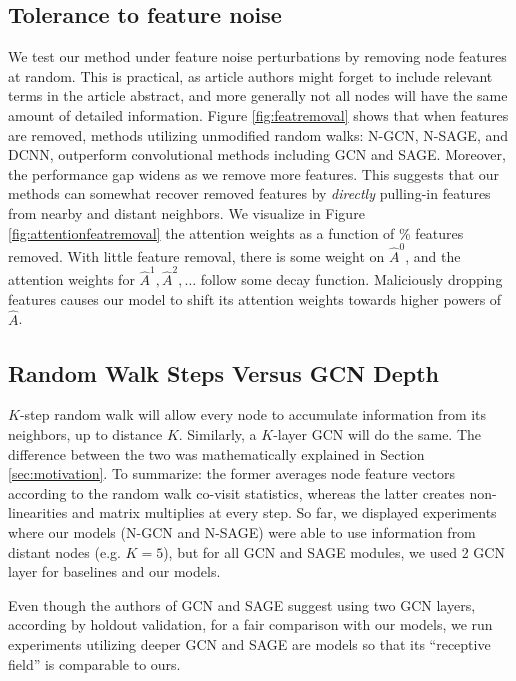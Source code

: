 \subsection{Tolerance to feature noise}
We test our method under feature noise perturbations by removing node features at random. This is practical, as article authors might forget to include relevant terms in the article abstract,
and more generally not all nodes will have the same amount of detailed information.
Figure \ref{fig:featremoval} shows that when features are removed, methods utilizing unmodified random walks: N-GCN, N-SAGE, and DCNN, outperform convolutional methods including GCN and SAGE. Moreover, the performance gap widens as we remove more features. This suggests that our methods can somewhat recover removed features by \textit{directly} pulling-in features from nearby and distant neighbors.
We visualize in Figure \ref{fig:attentionfeatremoval} the attention weights as a function of \% features removed. With little feature removal, there is some weight on $\hat{A}^{0}$, and the attention weights for $\hat{A}^{1}, \hat{A}^{2}, \dots$ follow some decay function. Maliciously dropping features causes our model to shift its attention weights towards higher powers of $\hat{A}$.


\subsection{Random Walk Steps Versus GCN Depth}

$K$-step random walk will allow every node to accumulate information from its neighbors, up to distance $K$. Similarly, a $K$-layer GCN \citep{kipf} will do the same. The difference between the two was mathematically explained in Section \ref{sec:motivation}. To summarize: the former averages node feature vectors according to the random walk co-visit statistics, whereas the latter creates non-linearities and matrix multiplies at every step. So far, we displayed experiments where our models (N-GCN and N-SAGE) were able to use information from distant nodes (e.g. $K=5$), but for all GCN and SAGE modules, we used 2 GCN layer for baselines and our models.

Even though the authors of GCN \citep{kipf} and SAGE \citep{sage} suggest using two GCN layers, according by holdout validation, for a fair comparison with our models, we run experiments utilizing deeper GCN and SAGE are models so that its ``receptive field'' is comparable to ours. 

